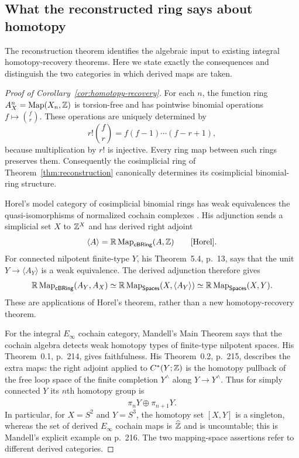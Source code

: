 \subsection{What the reconstructed ring says about homotopy}\label{sec:homotopy-recovery}
The reconstruction theorem identifies the algebraic input to existing
integral homotopy-recovery theorems. Here we state exactly the consequences
and distinguish the two categories in which derived maps are taken.

\begin{proof}[Proof of Corollary~\ref{cor:homotopy-recovery}]
For each $n$, the function ring $A_X^n=\operatorname{Map}(X_n,\mathbb Z)$
is torsion-free and has pointwise binomial operations
$f\mapsto\binom f r$. These operations are uniquely determined by
\[
 r!\binom f r=f(f-1)\cdots(f-r+1),
\]
because multiplication by $r!$ is injective. Every ring map between
such rings preserves them. Consequently the cosimplicial ring of
Theorem~\ref{thm:reconstruction} canonically determines its
cosimplicial binomial-ring structure.

Horel's model category of cosimplicial binomial rings has weak
equivalences the quasi-isomorphisms of normalized cochain complexes
\cite[Theorem~3.7, p.~7]{Horel}. His adjunction sends a simplicial
set $X$ to $\mathbb Z^X$ and has derived right adjoint
\[
 \langle A\rangle=\mathbb R\Map_{\mathsf{cBRing}}(A,\Z)
 \qquad\text{\cite[Section~4, p.~9]{Horel}}.
\]
For connected nilpotent finite-type $Y$, his Theorem~5.4, p.~13,
says that the unit $Y\to\langle A_Y\rangle$ is a weak equivalence.
The derived adjunction therefore gives
\[
 \mathbb R\operatorname{Map}_{\mathsf{cBRing}}(A_Y,A_X)
 \simeq\mathbb R\operatorname{Map}_{\mathsf{Spaces}}(X,\langle A_Y\rangle)
 \simeq\mathbb R\operatorname{Map}_{\mathsf{Spaces}}(X,Y).
\]
These are applications of Horel's theorem, rather than a new
homotopy-recovery theorem.

For the integral $E_\infty$ cochain category, Mandell's Main Theorem
\cite[p.~213]{Mandell} says that the cochain algebra detects weak
homotopy types of finite-type nilpotent spaces. His Theorem~0.1,
p.~214, gives faithfulness. His Theorem~0.2, p.~215, describes the
extra maps: the right adjoint applied to $C^*(Y;\mathbb Z)$ is the homotopy
pullback of the free loop space of the finite completion $Y^\wedge$
along $Y\to Y^\wedge$. Thus for simply connected $Y$ its $n$th
homotopy group is
\[
 \pi_nY\oplus\widehat{\pi_{n+1}Y}.
\]
In particular, for $X=S^2$ and $Y=S^3$, the homotopy set $[X,Y]$
is a singleton, whereas the set of derived $E_\infty$ cochain maps
is $\widehat{\mathbb Z}$ and is uncountable; this is Mandell's explicit
example on p.~216. The two mapping-space assertions refer to
different derived categories.


\end{proof}
